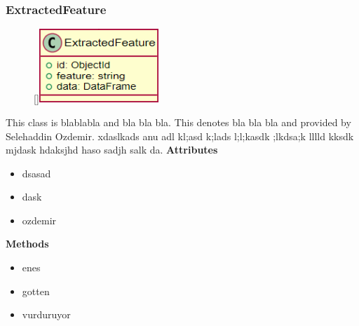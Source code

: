 \subsubsection{ExtractedFeature}
\begin{figure}
    \raisebox{0pt}[\dimexpr{}\baselineskip\relax]{\includegraphics[width=4.5cm]{classes/model-management/17.png}}
\end{figure} 
\par
This class is blablabla and bla bla bla. This denotes bla bla bla and provided by Selehaddin Ozdemir. xdaslkads anu adl kl;asd k;lads l;l;kasdk ;lkdsa;k lllld kksdk mjdask hdaksjhd haso sadjh salk da.
\newline
\newline
\textbf{Attributes}
\begin{itemize}
    \item dsasad
    \item dask
    \item ozdemir
\end{itemize}
\textbf{Methods}
\begin{itemize}
    \item enes
    \item gotten
    \item vurduruyor
\end{itemize}
